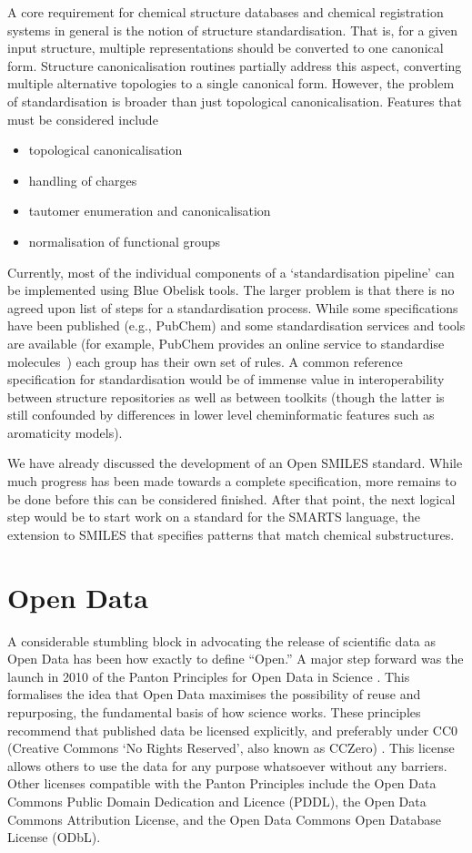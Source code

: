 \documentclass[10pt]{bmc_article}
\newenvironment{bmcformat}{\begin{raggedright}\baselineskip20pt\sloppy\setboolean{publ}{false}}{\end{raggedright}\baselineskip20pt\sloppy}
\begin{document}
\begin{bmcformat}
A core requirement for chemical structure databases and chemical
registration systems in general is the notion of structure
standardisation.  That is,  for a given input structure, multiple
representations should be converted to one canonical form.
Structure canonicalisation routines partially address this aspect,
converting multiple alternative topologies to a single canonical
form. However, the problem of standardisation is broader than just
topological canonicalisation. Features that must be considered include
\begin{itemize}
\item topological canonicalisation
\item handling of charges
\item tautomer enumeration and canonicalisation
\item normalisation of functional groups
\end{itemize}
Currently, most of the individual components of a `standardisation
pipeline' can be implemented using Blue Obelisk tools. The larger problem is
that there is no agreed upon list of steps for a standardisation
process. While some specifications have been published (e.g., PubChem)
and some standardisation services and tools are available (for
example, PubChem
provides an online service to standardise
molecules~\cite{WebPubChemStandardizer})
each group has their own set of rules. A
common reference specification for standardisation would be of immense
value in interoperability between structure repositories as well as
between toolkits (though the latter is still confounded by differences
in lower level cheminformatic features such as aromaticity models).

We have already discussed the development of an Open SMILES standard.
While much progress has been made towards a complete specification,
more remains to be done before this can be considered finished. After
that point, the next logical step would be to start work on a standard
for the SMARTS language, the extension to SMILES that specifies
patterns that match chemical substructures.

\section*{Open Data}

A considerable stumbling block in advocating the release of scientific
data as Open Data has been how exactly to define ``Open.'' A major step
forward was the launch in 2010 of the Panton Principles for Open Data
in Science \cite{WebPanton}. This formalises the idea that Open Data maximises the
possibility of reuse and repurposing, the fundamental basis
of how science works. These principles recommend that published data
be licensed explicitly, and preferably under CC0 (Creative Commons `No
Rights Reserved', also known as CCZero) \cite{WebCC0}. This license allows others to use the
data for any purpose whatsoever without any barriers. Other licenses
compatible with the Panton Principles include the
Open Data Commons Public Domain Dedication and Licence (PDDL), the
Open Data Commons Attribution License, and the
Open Data Commons Open Database License (ODbL).\cite{WebOpenData}


\end{bmcformat}
\end{document}
